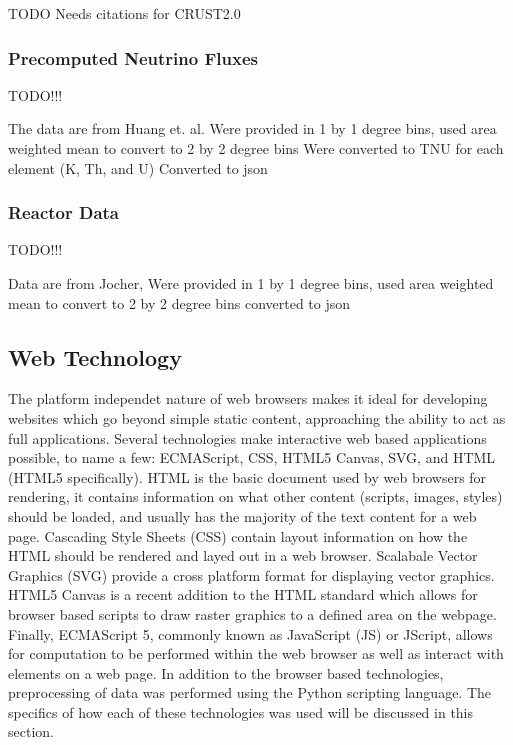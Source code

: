 \documentclass[12pt,a4paper]{article}
\begin{document}
TODO Needs citations for CRUST2.0
\subsubsection{Precomputed Neutrino Fluxes}
TODO!!!

The data are from Huang et. al.
Were provided in 1 by 1 degree bins, used area weighted mean to convert to 2 by 2 degree bins
Were converted to TNU for each element (K, Th, and U)
Converted to json

\subsubsection{Reactor Data}
TODO!!!

Data are from Jocher,
Were provided in 1 by 1 degree bins, used area weighted mean to convert to 2 by 2 degree bins
converted to json

\subsection{Web Technology}
The platform independet nature of web browsers makes it ideal for developing websites which go beyond simple static content, approaching the ability to act as full applications.
Several technologies make interactive web based applications possible, to name a few: ECMAScript, CSS, HTML5 Canvas, SVG, and HTML (HTML5 specifically).
HTML is the basic document used by web browsers for rendering, it contains information on what other content (scripts, images, styles) should be loaded, and usually has the majority of the text content for a web page.
Cascading Style Sheets (CSS) contain layout information on how the HTML should be rendered and layed out in a web browser.
Scalabale Vector Graphics (SVG) provide a cross platform format for displaying vector graphics.
HTML5 Canvas is a recent addition to the HTML standard which allows for browser based scripts to draw raster graphics to a defined area on the webpage.
Finally, ECMAScript 5, commonly known as JavaScript (JS) or JScript, allows for computation to be performed within the web browser as well as interact with elements on a web page.
In addition to the browser based technologies, preprocessing of data was performed using the Python scripting language.
The specifics of how each of these technologies was used will be discussed in this section.
\end{document}
